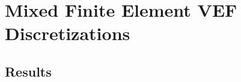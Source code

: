 \documentclass[../doc.tex]{subfiles}
\begin{document}
\chapter{Mixed Finite Element VEF Discretizations}

\section{Results}

\begin{table}
\centering
\caption{}
\label{}

\end{table}

\begin{table}
\centering
\caption{}
\label{}

\end{table}

\begin{table}
\centering
\caption{}
\label{}

\end{table}


\begin{table}
\centering
\caption{}
\label{}

\end{table}

\begin{table}
\centering
\caption{}
\label{}

\end{table}

\begin{table}
\centering
\caption{}
\label{}
\begin{adjustbox}{max width=\textwidth}

\end{adjustbox}
\end{table}

\begin{table}
\centering
\caption{}
\label{}

\end{table}
\end{document}
